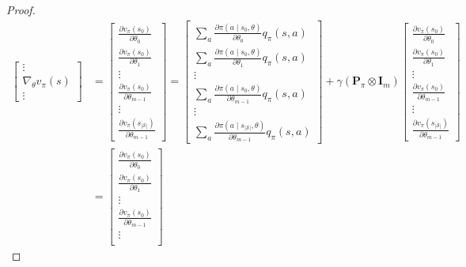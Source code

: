 ﻿\documentclass[11pt, a4paper]{report}
\begin{document}
\begin{proof}
\begin{align*}
\begin{bmatrix}
\vdots \\
\nabla_{\theta} v_{\pi}(s) \\
\vdots
\end{bmatrix}
&=
\begin{bmatrix}
\frac{\partial v_{\pi}(s_0)}{\partial \theta_0} \\
\frac{\partial v_{\pi}(s_0)}{\partial \theta_1} \\
\vdots \\
\frac{\partial v_{\pi}(s_0)}{\partial \theta_{m-1}} \\
\vdots \\
\frac{\partial v_{\pi}(s_{|\mathcal{S}|})}{\partial \theta_{m-1}}
\end{bmatrix}
=
\begin{bmatrix}
\sum_a \frac{\partial \pi(a \mid s_0, \theta)}{\partial \theta_0} q_{\pi}(s, a) \\
\sum_a \frac{\partial \pi(a \mid s_0, \theta)}{\partial \theta_1} q_{\pi}(s, a) \\
\vdots \\
\sum_a \frac{\partial \pi(a \mid s_0, \theta)}{\partial \theta_{m-1}} q_{\pi}(s, a) \\
\vdots \\
\sum_a \frac{\partial \pi(a \mid s_{|\mathcal{S}|}, \theta)}{\partial \theta_{m-1}} q_{\pi}(s, a)
\end{bmatrix}
+ \gamma (\bm{P}_{\pi} \otimes \bm{I}_m)
\begin{bmatrix}
\frac{\partial v_{\pi}(s_0)}{\partial \theta_0} \\
\frac{\partial v_{\pi}(s_0)}{\partial \theta_1} \\
\vdots \\
\frac{\partial v_{\pi}(s_0)}{\partial \theta_{m-1}} \\
\vdots \\
\frac{\partial v_{\pi}(s_{|\mathcal{S}|})}{\partial \theta_{m-1}}
\end{bmatrix} \\
&=
\begin{bmatrix}
\frac{\partial v_{\pi}(s_0)}{\partial \theta_0} \\
\frac{\partial v_{\pi}(s_0)}{\partial \theta_1} \\
\vdots \\
\frac{\partial v_{\pi}(s_0)}{\partial \theta_{m-1}} \\
\vdots \\

\end{bmatrix}
\end{align*}
\end{proof}
\end{document}
